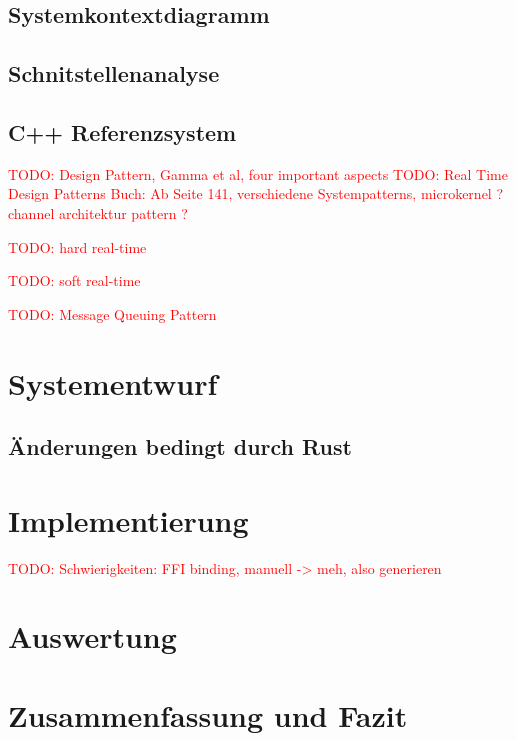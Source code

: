 \documentclass[
	12pt,
	table,
	bigheadings,
	ngerman,
	a4paper,
	BCOR5mm,
	DIV14,
	1.1headlines,
	pagesize,
	oneside,
	openright,
	titlepage,
	headsepline,
	nochapterprefix,
	bibtotoc,
	tocindent,
	listsindent,
	pointlessnumbers,
	cleardoubleempty,
	fleqn,
	halfparskip
]{scrbook}
\newcommand{\todo}[1]{\textcolor{red}{TODO: #1}}
\begin{document}
		\section{Systemkontextdiagramm}
		\section{Schnitstellenanalyse}
		\section{C++ Referenzsystem}
	
	\todo{Design Pattern, Gamma et al, four important aspects}
	\todo{Real Time Design Patterns Buch: Ab Seite 141, verschiedene Systempatterns, microkernel \cite[151]{douglass2003real}? channel architektur pattern \cite[167]{douglass2003real}?}
	
	\todo{hard real-time \cite[75]{douglass2003real}}
	
	\todo{soft real-time \cite[76]{douglass2003real}}
	
	\todo{Message Queuing Pattern \cite[207]{douglass2003real}}
		
	\chapter{Systementwurf}
		\section{Änderungen bedingt durch Rust}
	
	\chapter{Implementierung}
	\todo{Schwierigkeiten: FFI binding, manuell -> meh, also generieren}
	\chapter{Auswertung}
	\chapter{Zusammenfassung und Fazit}
	
	
	
	
	\clearpage
	\printbibliography
	
	\clearpage
	\printglossaries

	\clearpage
	\listoffigures
	
	
\end{document}

